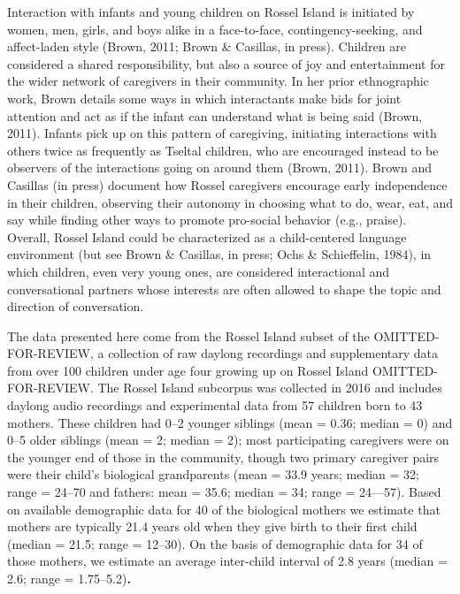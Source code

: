 \documentclass[,man,floatsintext]{apa6}
\begin{document}
Interaction with infants and young children on Rossel Island is
initiated by women, men, girls, and boys alike in a face-to-face,
contingency-seeking, and affect-laden style (Brown, 2011; Brown \&
Casillas, in press). Children are considered a shared responsibility,
but also a source of joy and entertainment for the wider network of
caregivers in their community. In her prior ethnographic work, Brown
details some ways in which interactants make bids for joint attention
and act as if the infant can understand what is being said (Brown,
2011). Infants pick up on this pattern of caregiving, initiating
interactions with others twice as frequently as Tseltal children, who
are encouraged instead to be observers of the interactions going on
around them (Brown, 2011). Brown and Casillas (in press) document how
Rossel caregivers encourage early independence in their children,
observing their autonomy in choosing what to do, wear, eat, and say
while finding other ways to promote pro-social behavior (e.g., praise).
Overall, Rossel Island could be characterized as a child-centered
language environment (but see Brown \& Casillas, in press; Ochs \&
Schieffelin, 1984), in which children, even very young ones, are
considered interactional and conversational partners whose interests are
often allowed to shape the topic and direction of conversation.

The data presented here come from the Rossel Island subset of the
OMITTED-FOR-REVIEW, a collection of raw daylong recordings and
supplementary data from over 100 children under age four growing up on
Rossel Island OMITTED-FOR-REVIEW. The Rossel Island subcorpus was
collected in 2016 and includes daylong audio recordings and experimental
data from 57 children born to 43 mothers. These children had 0--2
younger siblings (mean = 0.36; median = 0) and 0--5 older siblings (mean
= 2; median = 2); most participating caregivers were on the younger end
of those in the community, though two primary caregiver pairs were their
child's biological grandparents (mean = 33.9 years; median = 32; range =
24--70 and fathers: mean = 35.6; median = 34; range = 24---57). Based on
available demographic data for 40 of the biological mothers we estimate
that mothers are typically 21.4 years old when they give birth to their
first child (median = 21.5; range = 12--30). On the basis of demographic
data for 34 of those mothers, we estimate an average inter-child
interval of 2.8 years (median = 2.6; range = 1.75--5.2)\textbf{.}
\end{document}
